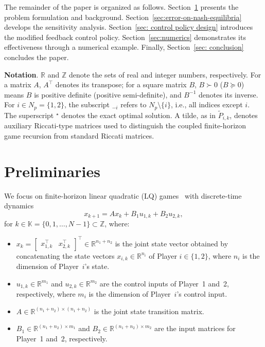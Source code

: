 \documentclass[letterpaper, 10 pt, conference]{ieeeconf}  %
\begin{document}
The remainder of the paper is organized as follows.
Section~\ref{sec: problem statement} presents the problem formulation and background.
Section~\ref{sec:error-on-nash-equilibria} develops the sensitivity analysis.
Section~\ref{sec: control policy design} introduces the modified feedback control policy.
Section~\ref{sec:numerics} demonstrates its effectiveness through a numerical example.
Finally, Section~\ref{sec: conclusion} concludes the paper.


\noindent \textbf{Notation}. $\mathbb{R}$ and $\mathbb{Z}$ denote the sets of real and integer numbers, respectively. For a matrix $A$, $A^\top$ denotes its transpose; for a square matrix $B$, $B \succ 0$ ($B \succeq 0$) means $B$ is positive definite (positive semi-definite), and $B^{-1}$ denotes its inverse. For $i \in N_p=\{1,2\}$, the subscript $_{-i}$ refers to $N_{p} \setminus \{i\}$, i.e., all indices except $i$. The superscript $^\star$ denotes the exact optimal solution. A tilde, as in $\tilde P_{i,k}$, denotes auxiliary Riccati-type matrices used to distinguish the coupled finite-horizon game recursion from standard Riccati matrices.

\section{Preliminaries}
\label{sec: problem statement}
We focus on finite-horizon linear quadratic (LQ) games~\cite{Engwerda2009lq} with discrete-time dynamics
\begin{equation}
    \label{eq:DT game dynamics}
    x_{k+1} = A x_k + B_1 u_{1,k} + B_2 u_{2,k},
\end{equation}
for $k \in \mathbb{K} = \{0,1,\dots, N-1\} \subset \mathbb{Z}$, where:
\begin{itemize}
    \item \(x_k = \begin{bmatrix} x_{1,k}^\top & x_{2,k}^\top \end{bmatrix}^\top
\in \mathbb{R}^{n_1+n_2}\) is the joint state vector obtained by concatenating the state vectors $x_{i,k} \in \mathbb{R}^{n_i}$ of Player $i \in \{1,2\}$, where $n_i$ is the dimension of Player~$i$'s state.
    \item \(u_{1,k} \in \mathbb{R}^{m_1}\) and \(u_{2,k} \in \mathbb{R}^{m_2}\) are the control inputs of Player~1 and~2, respectively, where $m_i$ is the dimension of Player~$i$'s control input.
    \item \(A \in \mathbb{R}^{(n_1+n_2)\times (n_1+n_2)}\) is the joint state transition matrix.
    \item \(B_1 \in \mathbb{R}^{(n_1+n_2)\times m_1}\) and \(B_2 \in \mathbb{R}^{(n_1+n_2)\times m_2}\) are the input matrices for Player~1 and~2, respectively.
\end{itemize}
\end{document}
